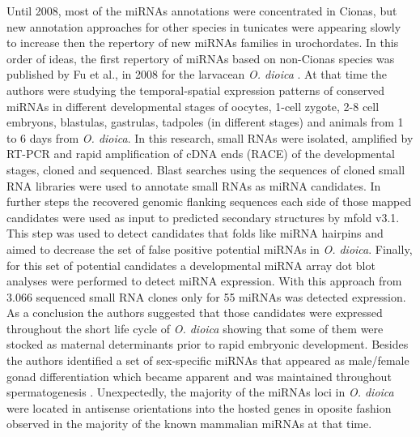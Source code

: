 \documentclass[graybox]{svmult}
\begin{document}
Until 2008, most of the miRNAs annotations were concentrated in Cionas, but new annotation approaches for other species in tunicates were appearing slowly to increase then the repertory of new miRNAs families in urochordates. In this order of ideas, the first repertory of miRNAs based on non-Cionas species was published by Fu et al., in  2008 for the larvacean \textit{O. dioica} \cite{Fu2008}. At that time the authors were studying the temporal-spatial expression patterns of conserved miRNAs in different developmental stages of oocytes, 1-cell zygote, 2-8 cell embryons, blastulas, gastrulas, tadpoles (in different stages) and animals from 1 to 6 days from \textit{O. dioica}. In this research, small RNAs were isolated, amplified by RT-PCR and rapid amplification of cDNA ends (RACE) of the developmental stages, cloned and sequenced. Blast searches using the sequences of cloned small RNA libraries were used to annotate small RNAs as miRNA candidates. In further steps the recovered  genomic flanking sequences each side of those mapped candidates were used as input to predicted secondary structures by mfold v3.1. This step was used to detect candidates that folds like miRNA hairpins  and aimed to decrease the set of false positive potential miRNAs in \textit{O. dioica}. Finally, for this set of potential candidates a developmental miRNA array dot blot analyses were performed to detect miRNA expression. With this approach from 3.066 sequenced small RNA clones only for 55 miRNAs was detected expression. As a conclusion the authors suggested that those candidates were expressed throughout the short life cycle of \textit{O. dioica} showing that some of them were stocked as maternal determinants prior to rapid embryonic development.  Besides the authors identified a set of sex-specific miRNAs that appeared as male/female gonad differentiation which became apparent and was maintained throughout spermatogenesis \cite{Fu2008}. Unexpectedly, the majority of the miRNAs loci in \textit{O. dioica} were located in antisense orientations into the hosted genes in oposite fashion observed in the majority of the known mammalian miRNAs at that time. 
\end{document}
